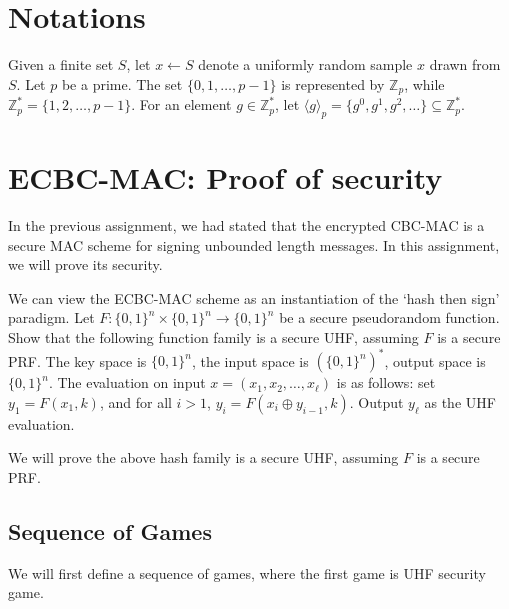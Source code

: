 \documentclass[10pt,addpoints]{exam}
\newcommand{\Z}{\mathbb{Z}}
\newcommand{\subgrp}[2]{\langle #1 \rangle_{#2}}
\newcommand{\sign}{\mathsf{Sign}}
\newcommand{\verify}{\mathsf{Verify}}
\newcommand{\zpst}{\mathbb{Z}_p^*}
\newcommand{\bit}{\{0,1\}}
\theoremstyle{definition}
\begin{document}
\vspace{0.4cm}

\section*{Notations}
Given a finite set $S$, let $x \gets S$ denote a uniformly random sample $x$ drawn from $S$. Let $p$ be a prime. The set $\{0,1,\ldots, p-1\}$ is represented by $\Z_p$, while $\zpst = \{1, 2, \ldots, p-1\}$. For an element $g \in \zpst$, let $\subgrp{g}{p} = \{g^0, g^1, g^2, \ldots \} \subseteq \zpst$. 



    
    \newcommand{\macell}{\mathsf{MAC}_{\ell}}
    \newcommand{\signell}{\sign_{\ell}}
    \newcommand{\verifyell}{\verify_{\ell}}
    \newcommand{\mell}{m_{\ell}}
    \newcommand{\yell}{y_{\ell}}

    \color{blue}


   
    \section{ECBC-MAC: Proof of security}

    In the previous assignment, we had stated that the encrypted CBC-MAC is a secure MAC scheme for signing unbounded length messages. In this assignment, we will prove its security. 


    We can view the ECBC-MAC scheme as an instantiation of the `hash then sign' paradigm. 
    Let $F: \bit^n \times \bit^n \to \bit^n$ be a secure pseudorandom function. Show that the following function family is a secure UHF, assuming $F$ is a secure PRF. The key space is $\bit^n$, the input space is $(\bit^n)^*$, output space is $\bit^n$. The evaluation on input $x = (x_1, x_2, \ldots, x_{\ell})$ is as follows: set $y_1 = F(x_1, k)$, and for all $i>1$, $y_{i} = F(x_i \oplus y_{i-1}, k)$. Output $y_{\ell}$ as the UHF evaluation. 

    \vspace{10pt}


    \color{black}

    We will prove the above hash family is a secure UHF, assuming $F$ is a secure PRF. 

    \subsection{Sequence of Games}
    We will first define a sequence of games, where the first game is UHF security game. 
\end{document}
